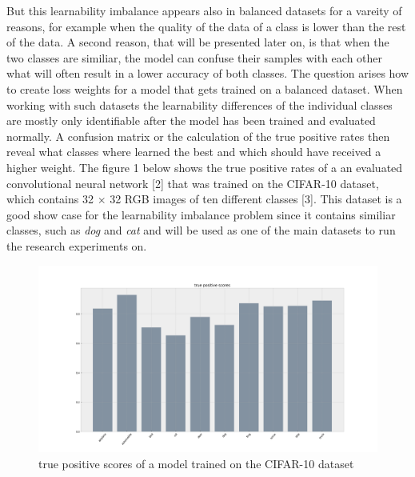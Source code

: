 \documentclass[journal]{IEEEtran}
\begin{document}

But this learnability imbalance appears also in balanced datasets for a vareity of reasons, for example when the quality of the data of a class is lower than the rest of the data. 
A second reason, that will be presented later on, is that when the two classes are similiar, 
the model can confuse their samples with each other what will often result in a lower accuracy of both classes. 
The question arises how to create loss weights for a model that gets trained on a balanced dataset. 
When working with such datasets the learnability differences of the individual classes are mostly only identifiable after the model has been trained and evaluated normally.
A confusion matrix or the calculation of the true positive rates then reveal what classes where learned the best and which should have received a higher weight.
The figure 1 below shows the true positive rates of a an evaluated convolutional neural network [2] that was trained on the CIFAR-10 dataset, which contains 32 $\times$ 32 RGB images of ten different classes [3].
This dataset is a good show case for the learnability imbalance problem since it contains similiar classes, such as \emph{dog} and \emph{cat} and will be used as one of the main datasets to run the research experiments on.

\begin{figure}[h!]
        \includegraphics[width=\linewidth]{images/cifar10_tp_scores.png}
        \caption{true positive scores of a model trained on the CIFAR-10 dataset}
        \label{fig:tp_scores}
\end{figure}
\end{document}
